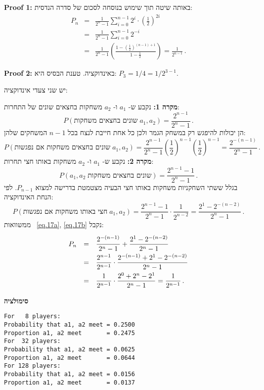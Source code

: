 \textbf{Proof 1:}
באותה שיטה תוך שימוש בנוסחה לסכום של סדרה הנדסית:
\begin{eqnarray*}
P_n&=&\frac{1}{2^n-1}\sum_{i=0}^{n-1}2^i\cdot \left(\frac{1}{2}\right)^{2i}\\
&=&\frac{1}{2^n-1}\sum_{i=0}^{n-1}2^{-i}\\
&=&\frac{1}{2^n-1}
  \left(
    \frac{1-\left(\frac{1}{2}\right)^{(n-1)+1}}
         {1-\frac{1}{2}}
  \right)=\frac{1}{2^{n-1}}\,.
\end{eqnarray*}

\textbf{Proof 2:}
באינדוקציה. טענת הבסיס היא:
$P_3=1/4=1/2^{3-1}$.

יש שני צעדי אינדוקציה:

\textbf{מקרה 1:} 
נקבע ש-%
$a_1$
ו-%
$a_2$
משחקות בחצאים שונים של התחרות:
\[
P(\textrm{שונים בחצאים משחקות}\;a_1,a_2)=\frac{2^{n-1}}{2^n-1}\,.
\]
הן יכולות להיפגש רק במשחק הגמר ולכן כל אחת חייבת לנצח בכל 
$n-1$
המשחקים שלהן:
\begin{equation}\label{eq.17a}
P(\textrm{שונים בחצאים משחקות אם נפגשות}\; a_1,a_2)=\frac{2^{n-1}}{2^n-1} \left(\frac{1}{2}\right)^{n-1} \left(\frac{1}{2}\right)^{n-1}=\frac{2^{-(n-1)}}{2^n-1}\,.
\end{equation}
\textbf{מקרה 2:}
נקבע ש-%
$a_1$
ו-%
$a_2$
משחקות באותו חצי תחרות:
\[
P(a_1,a_2\;\textrm{שונים בחצאים משחקות})=\frac{2^{n-1}-1}{2^n-1}\,.
\]
בגלל ששתי השחקניות משחקות באותו חצי הבעיה מצטמטת בדרישה למצוא
$P_{n-1}$.
לפי הנחת האינדוקציה:
\begin{equation}\label{eq.17b}
P(\textrm{חצי באותו משחקות אם נפגשות}\; a_1,a_2)=\frac{2^{n-1}-1}{2^n-1}\cdot \frac{1}{2^{n-2}}=\frac{2^{1}-2^{-(n-2)}}{2^n-1}\,.
\end{equation}
ממשוואות%
~\ref{eq.17a}, \ref{eq.17b}
נקבל:
\[
\renewcommand*{\arraystretch}{2.2}
\begin{array}{rcl}
P_n&=&\disfrac{2^{-(n-1)}}{2^n-1}+\disfrac{2^{1}-2^{-(n-2)}}{2^n-1}\\
&=&\disfrac{2^{n-1}}
        {2^{n-1}}\cdot 
   \disfrac{2^{-(n-1)}+2^{1}-2^{-(n-2)}}
        {2^n-1}\\
&=&\disfrac{1}
        {2^{n-1}}\cdot 
   \disfrac{2^0+2^n-2^1}
        {2^n-1}=\disfrac{1}{2^{n-1}}\,.
\end{array}
\]

\textbf{סימולציה}
\begin{verbatim}
For   8 players:
Probability that a1, a2 meet = 0.2500
Proportion a1, a2 meet       = 0.2475
For  32 players:
Probability that a1, a2 meet = 0.0625
Proportion a1, a2 meet       = 0.0644
For 128 players:
Probability that a1, a2 meet = 0.0156
Proportion a1, a2 meet       = 0.0137
\end{verbatim}

